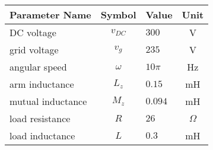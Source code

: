 \begin{tabular}{lclc}
\hline
 Parameter Name    &  Symbol  & Value    &   Unit   \\
\hline
 DC voltage        & $v_{DC}$ & $300$    &    V     \\
 grid voltage      & $v_{g}$  & $235$    &    V     \\
 angular speed     & $\omega$ & $10 \pi$ &    Hz    \\
 arm inductance    & $L_{z}$  & $0.15$   &    mH    \\
 mutual inductance & $M_{z}$  & $0.094$  &    mH    \\
 load resistance   &   $R$    & $26$     & $\Omega$ \\
 load inductance   &   $L$    & $0.3$    &    mH    \\
\hline
\end{tabular}